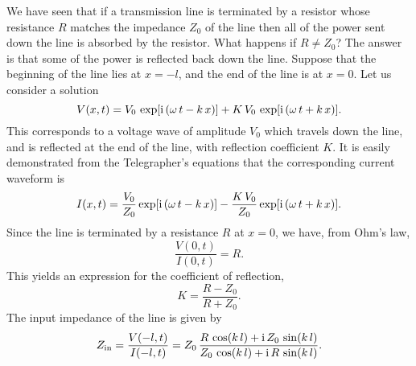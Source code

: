 We have seen that if a transmission line is terminated by a resistor whose
resistance $R$ matches the impedance $Z_0$ 
of the line then all of the power sent down the
line is absorbed by the resistor. What happens if $R\neq Z_0$? The answer is
that
some of the power is reflected back down the line. Suppose that the
beginning of the line lies at $x=-l$, and the end of the line is at $x=0$.
Let us consider a solution
\begin{equation}
V(x, t) = V_0 \,\exp[{\rm i}\,(\omega \,t - k\,x)] + K\, V_0 \, \exp[{\rm i}\,(\omega\, t + k\,x)].
\end{equation}
This corresponds to a voltage wave of amplitude $V_0$ which travels down the line,
and is reflected at the end of the line, with reflection coefficient $K$. 
It is easily demonstrated from the Telegrapher's equations that the corresponding
current waveform is
\begin{equation}
I(x, t) = \frac{V_0}{Z_0} \exp[{\rm i}\,(\omega\, t - k\,x)] - \frac{K \,V_0}{Z_0}
 \exp[{\rm i}\,(\omega\, t + k\,x)].
\end{equation}
Since the line is terminated by a resistance $R$ at $x=0$, we have, from
Ohm's law, 
\begin{equation}
\frac{V(0,t)}{I(0,t)} = R.
\end{equation}
This yields an expression for the coefficient of reflection,
\begin{equation}
K = \frac{ R - Z_0}{R+Z_0}.
\end{equation}
The input impedance of the line is given by
\begin{equation}
Z_{\rm in} = \frac{V(-l, t)}{I(-l, t)} = Z_0\, \frac{R \,\cos (k\,l) +{\rm i}\,Z_0 \,\sin( k\,l)}
{Z_0 \,\cos (k\,l) + {\rm i}\, R \,\sin (k\,l)}.
\end{equation}

